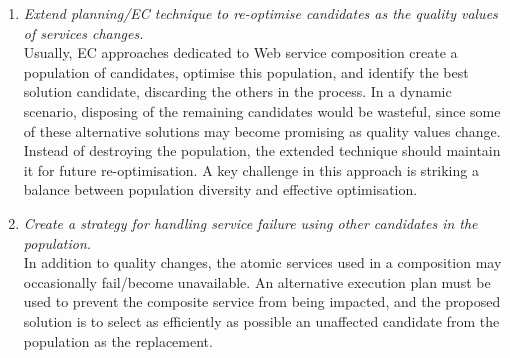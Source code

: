 \begin{enumerate}
 \begin{enumerate}
 \item \label{obj:dyna-qos} \emph{Extend planning/EC technique to re-optimise candidates as the quality values of services changes.}\\
 Usually, EC approaches dedicated to Web service composition create a population of candidates, optimise this population, and identify the best solution candidate, discarding the others in the process. In a dynamic scenario, disposing of the remaining candidates would be wasteful, since some of these alternative solutions may become promising as quality values change. Instead of destroying the population, the extended technique should maintain it for future re-optimisation. A key challenge in this approach is striking a balance between population diversity and effective optimisation.
 \item \label{obj:dyna-fail} \emph{Create a strategy for handling service failure using other candidates in the population.}\\
 In addition to quality changes, the atomic services used in a composition may occasionally fail/become unavailable. An alternative execution plan must be used to prevent the composite service from being impacted, and the proposed solution is to select as efficiently as possible an unaffected candidate from the population as the replacement.
 \end{enumerate}
 
\end{enumerate}





